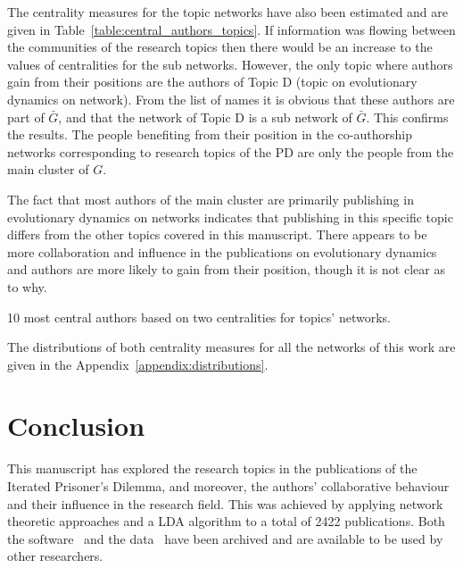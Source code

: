 \documentclass{article}
\theoremstyle{definition}
\begin{document}
The centrality measures for the topic networks have also been estimated and are
given in
Table~\ref{table:central_authors_topics}.
If information was flowing between the communities of the research topics then
there would be an increase to the values of centralities for the sub networks.
However, the only topic where authors gain from their positions are the authors
of Topic D (topic on evolutionary dynamics on network). From the list of names it is obvious that these authors are
part of \(\bar{G}\), and that the network of Topic D is a sub network of \(\bar{G}\).
This confirms the results. The people benefiting from their position in the co-authorship networks
corresponding to research topics of the PD are only the people from the main
cluster of \(G\).

The fact that most authors of the main cluster are primarily publishing in
evolutionary dynamics on networks indicates that publishing in this specific
topic differs from the other topics covered in this manuscript. There appears to
be more collaboration and influence in the publications on evolutionary
dynamics and authors are more likely to gain from their position,
though it is not clear as to why.

\begin{table}[!hbtp]
    \begin{center}
    \resizebox{.9\textwidth}{!}{}
\end{center}
\caption{10 most central authors based on two centralities
for topics' networks.}\label{table:central_authors_topics}
\end{table}

The distributions of both centrality measures for all the networks of this
work are given in the Appendix~\ref{appendix:distributions}.

\section{Conclusion}\label{section:conclusion}

This manuscript has explored the research topics in the publications of the
Iterated Prisoner's Dilemma, and moreover, the authors' collaborative behaviour
and their influence in the research field. This was achieved by
applying network theoretic approaches and a LDA algorithm to a total of 2422
publications. Both the software~\cite{nikoleta_2017} and the data~\cite{pd_data_2018}
have been archived and are available to be used by other researchers.
\end{document}
